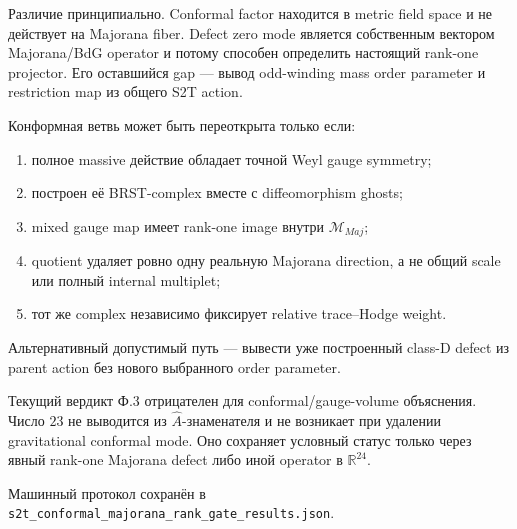 Различие принципиально. Conformal factor находится в metric field space и
не действует на Majorana fiber. Defect zero mode является собственным
вектором Majorana/BdG operator и потому способен определить настоящий
rank-one projector. Его оставшийся gap --- вывод odd-winding mass order
parameter и restriction map из общего S2T action.

\begin{protocol}
Конформная ветвь может быть переоткрыта только если:
\begin{enumerate}
 \item полное massive действие обладает точной Weyl gauge symmetry;
 \item построен её BRST-complex вместе с diffeomorphism ghosts;
 \item mixed gauge map имеет rank-one image внутри \(\mathcal M_{Maj}\);
 \item quotient удаляет ровно одну реальную Majorana direction, а не общий
 scale или полный internal multiplet;
 \item тот же complex независимо фиксирует relative trace--Hodge weight.
\end{enumerate}
Альтернативный допустимый путь --- вывести уже построенный class-D defect из
parent action без нового выбранного order parameter.
\end{protocol}

Текущий вердикт Ф.3 отрицателен для conformal/gauge-volume объяснения.
Число \(23\) не выводится из \(\widehat A\)-знаменателя и не возникает при
удалении gravitational conformal mode. Оно сохраняет условный статус только
через явный rank-one Majorana defect либо иной operator в \(\mathbb R^{24}\).

Машинный протокол сохранён в
\texttt{s2t\_conformal\_majorana\_rank\_gate\_results.json}.